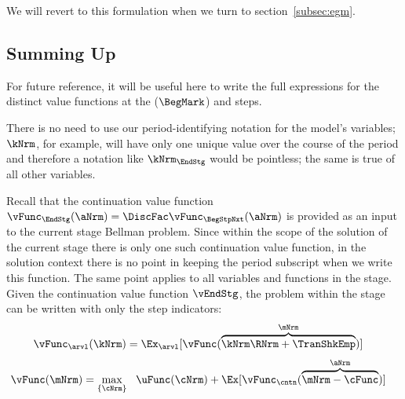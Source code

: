 We will revert to this formulation when we turn to section~\ref{subsec:egm}.

\hypertarget{summing-up}{}
\subsection{Summing Up}\label{subsec:summing-up}
For future reference, it will be useful here to write the full expressions for the distinct value functions at the {\Arrival} ($\BegMark$) and {\Decision} {steps}.  %

There is no need to use our {period}-identifying notation for the model's variables; $\kNrm$, for example, will have only one unique value over the course of the {period} and therefore a notation like $\kNrm_{\EndStg}$ would be pointless; the same is true of all other variables.

Recall that the continuation value function $\vFunc_{\EndStg}(\aNrm)=\DiscFac \vFunc_{\BegStpNxt}(\aNrm)$ is provided as an input to the current {stage} Bellman problem.  Since within the scope of the solution of the current {stage} there is only one such continuation value function, in the solution context there is no point in keeping the {period} subscript when we write this function.  The same point applies to all variables and functions in the {stage}.  Given the continuation value function $\vEndStg$, the problem within the {stage} can be written with only the {step} indicators:
  \begin{equation}\begin{gathered}\begin{aligned}
        \vFunc_{\arvl}(\kNrm) & = \Ex_{\arvl}[\vFunc(\overbrace{\kNrm \RNrm + \TranShkEmp}^{\mNrm})]  \label{eq:vBegStg}
      \end{aligned}\end{gathered}\end{equation}
  \begin{equation}\begin{gathered}\begin{aligned}
        \vFunc(\mNrm) & = \max_{\{{\cNrm}\}}~~\uFunc(\cNrm) +\Ex[ \vFunc_{\cntn}(\overbrace{\mNrm-\cFunc}^{\aNrm})] \label{eq:vMid}
      \end{aligned}\end{gathered}\end{equation}

